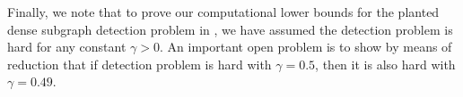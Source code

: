 Finally, we note that to prove our computational lower bounds for the planted dense subgraph detection problem in , 
we have assumed the \PC detection problem is hard for any constant $\gamma>0$. 
An important open problem is to show by means of reduction that 
if \PC detection problem is hard with $\gamma=0.5$, then it is also hard with $\gamma=0.49$.






